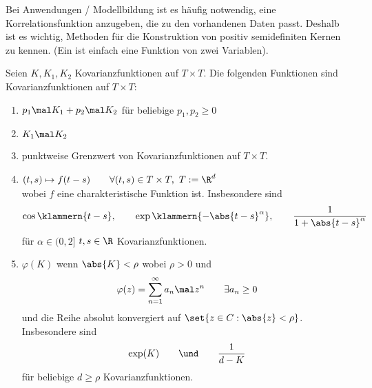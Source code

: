 Bei Anwendungen / Modellbildung ist es häufig notwendig, eine Korrelationsfunktion anzugeben, die zu den vorhandenen Daten passt.
Deshalb ist es wichtig, Methoden für die Konstruktion von positiv semidefiniten Kernen zu kennen.
(Ein  ist einfach eine Funktion von zwei Variablen).

\begin{aufgabenr}\label{aufg:19}\enter
	Seien $K,K_1,K_2$ Kovarianzfunktionen auf $T\times T$.
	Die folgenden Funktionen sind Kovarianzfunktionen auf $T\times T$:
	\begin{enumerate}[label=(\roman*)]
		\item $\begin{aligned}
			p_1\mal K_1+p_2\mal K_2
		\end{aligned}$ für beliebige $p_1,p_2\geq0$
		\label{item:aufg19_i}
		\item $K_1\mal K_2$
		\label{item:aufg19_ii}
		\item punktweise Grenzwert von Kovarianzfunktionen auf $T\times T$.
		\label{item:aufg19_iii}
		\item $\begin{aligned}
			(t,s)\mapsto f(t-s)\qquad\forall (t,s)\in T\times T,~T:=\R^d
		\end{aligned}$\\
		wobei $f$ eine charakteristische Funktion ist.
		Insbesondere sind
		\begin{align*}
			\cos\klammern{t-s},\qquad\exp\klammern{-\abs{t-s}^\alpha},\qquad
			\frac{1}{1+\abs{t-s}^\alpha}
		\end{align*}
		für $\alpha\in(0,2]$ $t,s\in\R$ Kovarianzfunktionen.
		\label{item:aufg19_iv}
		\item $\varphi(K)$ wenn $\abs{K}<\rho$ wobei $\rho>0$ und 
		\begin{align*}
			\varphi(z)=\sum\limits_{n=1}^\infty a_n\mal z^n\qquad\exists a_n\geq 0
		\end{align*}
		und die Reihe absolut konvergiert auf $\set{z\in C:\abs{z}<\rho}$.
		Insbesondere sind 
		\begin{align*}
			\exp(K)
			\qquad\und\qquad
			\frac{1}{d-K}
		\end{align*}
		für beliebige $d\geq \rho$ Kovarianzfunktionen.
		\label{item:aufg19_v}
	\end{enumerate}
\end{aufgabenr}

\setcounter{satz}{5}

